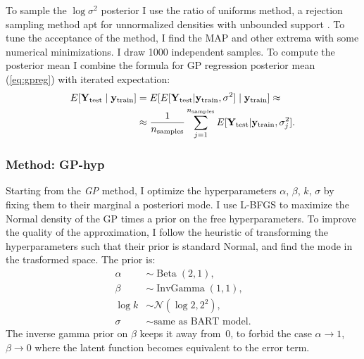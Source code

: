 \documentclass[a4paper]{article}
\theoremstyle{definition}
\let\oldmarginpar\marginpar
\renewcommand{\marginpar}[1]{\oldmarginpar{\sffamily\scriptsize #1}}
\renewcommand{\marginpar}[1]{\relax} %
\begin{document}
    To sample the $\log\sigma^2$ posterior I use the ratio of uniforms method, a rejection sampling method apt for unnormalized densities with unbounded support \autocite{kinderman1977}. To tune the acceptance of the method, I find the MAP and other extrema with some numerical minimizations. I draw 1000 independent samples. To compute the posterior mean I combine the formula for GP regression posterior mean (\autoref{eq:gpreg}) with iterated expectation:
    \begin{align}
        E[\mathbf Y_\text{test}\mid\mathbf y_\text{train}] &=
            E[E[\mathbf Y_\text{test}|\mathbf y_\text{train}, \sigma^2]\mid\mathbf y_\text{train}] \approx \notag \\
        &\approx \frac 1 {n_\text{samples}} \sum_{j=1}^{n_\text{samples}} E[\mathbf Y_\text{test}|\mathbf y_\text{train}, \sigma^2_j].
    \end{align}

    \subsubsection{Method: GP-hyp}
    \label{sec:modelgphyp}

    Starting from the \emph{GP} method, I optimize the hyperparameters $\alpha$, $\beta$, $k$, $\sigma$ by fixing them to their marginal a posteriori mode. I use L-BFGS to maximize the Normal density of the GP times a prior on the free hyperparameters. To improve the quality of the approximation, I follow the heuristic of transforming the hyperparameters such that their prior is standard Normal, and find the mode in the trasformed space. The prior is:
    \begin{align}
        \alpha &\sim \operatorname{Beta}(2, 1), \\
        \beta &\sim \operatorname{InvGamma}(1, 1), \\
        \log k &\sim \mathcal N(\log 2, 2^2), \\
        \sigma &\sim \text{same as BART model.}
    \end{align}
    The inverse gamma prior on $\beta$ keeps it away from~0, to forbid the case $\alpha\to 1$, $\beta\to 0$ where the latent function becomes equivalent to the error term.\marginpar{Tuning $k$ is probably doing a lot here, the R packages leave notes on the ground, as $k$ could be inferred in the MCMC. But then why does \texttt{dbarts} set $k$ to a constant by default, despite implementing its inference?}
\end{document}
